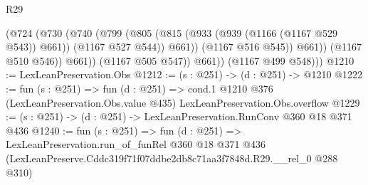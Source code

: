 \begin{lexlean}{R29}
\begin{coremodule}
                    (@724
                      (@730
                        (@740
                          (@799
                            (@805
                              (@815 (@933 (@939 (@1166 (@1167 @529 @543)) @661)) (@1167 @527 @544))
                              @661))
                          (@1167 @516 @545))
                        @661))
                    (@1167 @510 @546))
                  @661))
              (@1167 @505 @547))
            @661))
        (@1167 @499 @548)))
@1210 := LexLeanPreservation.Obs
@1212 := (s : @251) -> (d : @251) -> @1210
@1222 := fun (s : @251) =>
  fun (d : @251) =>
  cond.{1} @1210 @376 (LexLeanPreservation.Obs.value @435) LexLeanPreservation.Obs.overflow
@1229 := (s : @251) -> (d : @251) -> LexLeanPreservation.RunConv @360 @18 @371 @436
@1240 := fun (s : @251) =>
  fun (d : @251) =>
  LexLeanPreservation.run_of_funRel
    @360
    @18
    @371
    @436
    (LexLeanPreserve.Cddc319f71f07ddbe2db8c71aa3f7848d.R29.__rel_0 @288 @310)
\end{coremodule}
\end{lexlean}
